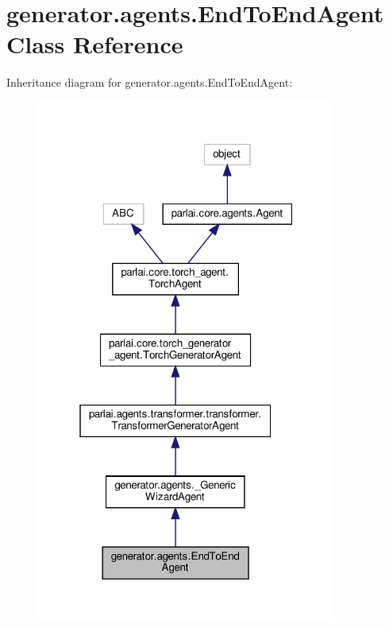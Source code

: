 \hypertarget{classgenerator_1_1agents_1_1EndToEndAgent}{}\section{generator.\+agents.\+End\+To\+End\+Agent Class Reference}
\label{classgenerator_1_1agents_1_1EndToEndAgent}


Inheritance diagram for generator.\+agents.\+End\+To\+End\+Agent\+:
\nopagebreak
\begin{figure}[H]
\begin{center}
\leavevmode
\includegraphics[width=280pt]{classgenerator_1_1agents_1_1EndToEndAgent__inherit__graph}
\end{center}
\end{figure}


